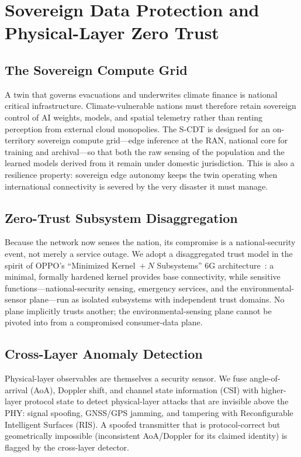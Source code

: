 \documentclass[10pt,twocolumn]{article}
\begin{document}
\section{Sovereign Data Protection and Physical-Layer Zero Trust}
\label{sec:security}

\subsection{The Sovereign Compute Grid}
A twin that governs evacuations and underwrites climate finance is national
critical infrastructure. Climate-vulnerable nations must therefore retain
sovereign control of AI weights, models, and spatial telemetry rather than
renting perception from external cloud monopolies. The S-CDT is designed for an
on-territory sovereign compute grid---edge inference at the RAN, national core
for training and archival---so that both the raw sensing of the population and
the learned models derived from it remain under domestic jurisdiction. This is
also a resilience property: sovereign edge autonomy keeps the twin operating
when international connectivity is severed by the very disaster it must manage.

\subsection{Zero-Trust Subsystem Disaggregation}
Because the network now senses the nation, its compromise is a national-security
event, not merely a service outage. We adopt a disaggregated trust model in the
spirit of OPPO's ``Minimized Kernel~$+~N$ Subsystems'' 6G
architecture~\cite{oppo_kernel,oppo_sec}: a minimal, formally hardened kernel
provides base connectivity, while sensitive functions---national-security
sensing, emergency services, and the environmental-sensor plane---run as
isolated subsystems with independent trust domains. No plane implicitly trusts
another; the environmental-sensing plane cannot be pivoted into from a
compromised consumer-data plane.

\subsection{Cross-Layer Anomaly Detection}
Physical-layer observables are themselves a security sensor. We fuse
angle-of-arrival (AoA), Doppler shift, and channel state information (CSI) with
higher-layer protocol state to detect physical-layer attacks that are invisible
above the PHY: signal spoofing, GNSS/GPS jamming, and tampering with
Reconfigurable Intelligent Surfaces (RIS). A spoofed transmitter that is
protocol-correct but geometrically impossible (inconsistent AoA/Doppler for its
claimed identity) is flagged by the cross-layer detector.
\end{document}
